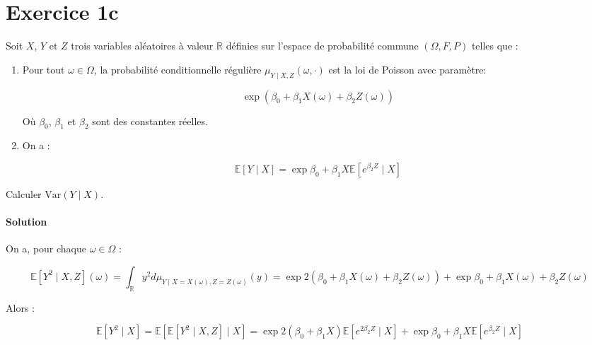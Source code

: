 \documentclass[../main.tex]{subfiles}
\begin{document}
\section*{Exercice 1c}
\begin{CJK*}{UTF8}{gbsn}
Soit $X$, $Y$ et $Z$ trois variables aléatoires à valeur $\mathbb{R}$ définies sur
l'espace de probabilité commune $(\Omega, F, P)$ telles que :

\begin{enumerate}
    \item Pour tout $\omega \in \Omega$, la probabilité conditionnelle régulière $\mu_{Y \mid X, Z}(\omega, \cdot)$ 
    est la loi de Poisson avec paramètre:

    \begin{equation*}
        \exp(\beta_0 + \beta_1 X(\omega) + \beta_2 Z(\omega))
    \end{equation*} 

    Où $\beta_0$, $\beta_1$ et $\beta_2$ sont des constantes réelles.

    \item On a :
    
    \begin{equation*}
        \mathbb{E}[Y \mid X] = \exp{\beta_0+\beta_1 X} \mathbb{E}[e^{\beta_2 Z} \mid X]
    \end{equation*}
\end{enumerate}

Calculer $\text{Var}(Y \mid X)$.

\smallskip
\paragraph{Solution}
On a, pour chaque $\omega \in \Omega$ :

\begin{equation*}
    \mathbb{E}[Y^2 \mid X, Z](\omega) = \int_{\mathbb{R}} y^2 d \mu_{Y \mid X = X(\omega), Z = Z(\omega)} (y) = 
    \exp{2(\beta_0 + \beta_1X(\omega) + \beta_2Z(\omega))}  + \exp{\beta_0 + \beta_1X(\omega) + \beta_2Z(\omega)}
\end{equation*}

Alors :

\begin{equation*}
    \mathbb{E}[Y^2 \mid X] = \mathbb{E}[\mathbb{E}[Y^2 \mid X, Z] \mid X] = 
    \exp{2(\beta_0+\beta_1X)}\mathbb{E}[e^{2 \beta_2 Z} \mid X] + \exp{\beta_0 + \beta_1 X} \mathbb{E}[e^{\beta_2Z} \mid X]
\end{equation*}


\end{CJK*}
\end{document}
